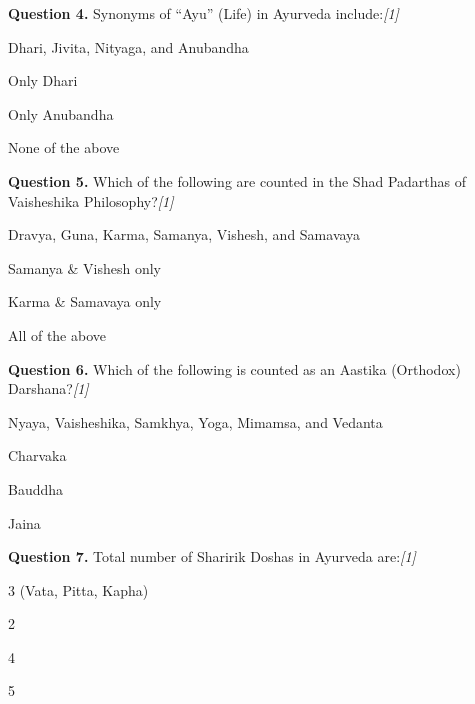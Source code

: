\documentclass[11pt,a4paper]{article}
\newcommand{\pts}[1]{\hfill   \textit{[#1]}}
\begin{document}
\medskip




\noindent   \textbf{Question 4.} Synonyms of ``Ayu'' (Life) in Ayurveda include:\pts{1}

\begin{parts}
  \item Dhari, Jivita, Nityaga, and Anubandha
  \item Only Dhari
  \item Only Anubandha
  \item None of the above
\end{parts}

\medskip




\noindent   \textbf{Question 5.} Which of the following are counted in the Shad Padarthas of Vaisheshika Philosophy?\pts{1}

\begin{parts}
  \item Dravya, Guna, Karma, Samanya, Vishesh, and Samavaya
  \item Samanya \& Vishesh only
  \item Karma \& Samavaya only
  \item All of the above
\end{parts}

\medskip




\noindent   \textbf{Question 6.} Which of the following is counted as an Aastika (Orthodox) Darshana?\pts{1}

\begin{parts}
  \item Nyaya, Vaisheshika, Samkhya, Yoga, Mimamsa, and Vedanta
  \item Charvaka
  \item Bauddha
  \item Jaina
\end{parts}

\medskip




\noindent   \textbf{Question 7.} Total number of Sharirik Doshas in Ayurveda are:\pts{1}

\begin{parts}
  \item 3 (Vata, Pitta, Kapha)
  \item 2
  \item 4
  \item 5
\end{parts}
\end{document}
